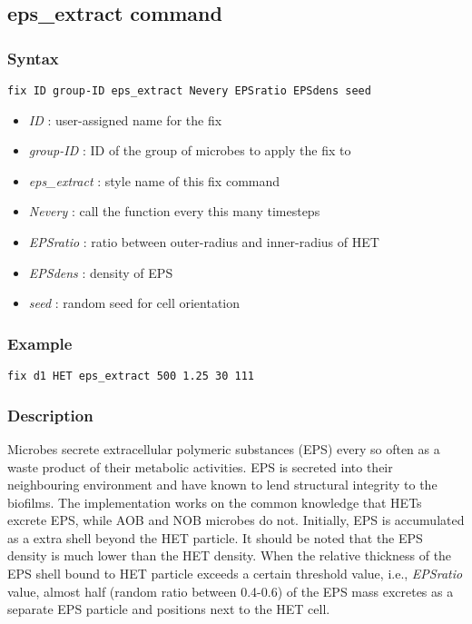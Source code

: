 \documentclass[11pt,a4paper,openright]{article}
\begin{document}
\subsection{eps\_extract command}
\subsubsection*{Syntax}

\begin{Verbatim}[frame=single]
  fix ID group-ID eps_extract Nevery EPSratio EPSdens seed
\end{Verbatim}

\begin{itemize}
\item
	{\it ID }: user-assigned name for the fix
\item
	{\it group-ID }: ID of the group of microbes to apply the fix to
\item
	{\it eps\_extract }: style name of this fix command
\item
	{\it Nevery }: call the function every this many timesteps
\item
	{\it EPSratio }: ratio between outer-radius and inner-radius of HET
\item
	{\it EPSdens }: density of EPS 
\item 
	{\it seed }: random seed for cell orientation
\end{itemize}

\subsubsection*{Example}

\begin{Verbatim}[frame=single]
	fix d1 HET eps_extract 500 1.25 30 111
\end{Verbatim}

\subsubsection*{Description}
Microbes secrete extracellular polymeric substances (EPS) every so often
as a waste product of their metabolic activities. EPS is secreted into their
neighbouring environment and have known to lend structural integrity to
the biofilms. The implementation works on the common knowledge that HETs 
excrete EPS, while AOB and NOB microbes do not. Initially, EPS is accumulated
as a extra shell beyond the HET particle. It should be noted that
the EPS density is much lower than the HET density. When the relative
thickness of the EPS shell bound to HET particle exceeds a certain threshold
value, i.e., {\it EPSratio} value, 
almost half (random ratio between 0.4-0.6) of the EPS mass excretes
as a separate EPS particle and positions next to the HET cell.
\end{document}
